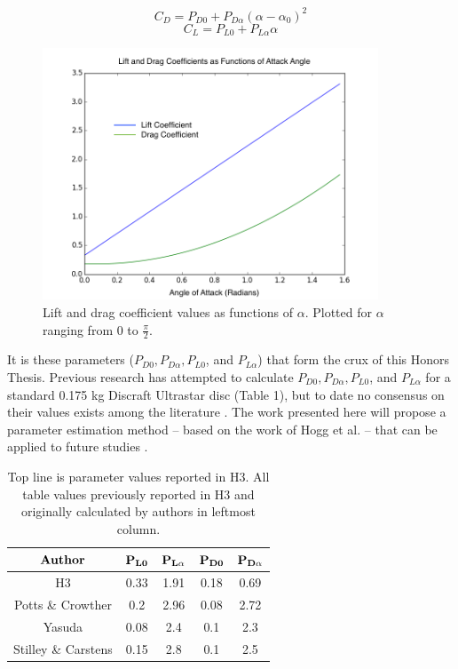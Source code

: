\documentclass[a4paper,12pt, oneside]{article}
\begin{document}
\begin{equation}
  C_D=P_{D0}+P_{D\alpha}(\alpha-\alpha_0)^2
\end{equation}
\begin{equation}
  C_L=P_{L0}+P_{L\alpha}\alpha
\end{equation}
\begin{figure}[H]
	\centering
	\includegraphics[width=10cm, height=7.5cm]{liftanddrag}
	\caption{Lift and drag coefficient values as functions of $\alpha.$ Plotted for $\alpha$ ranging from 0 to $\frac{\pi}{2}$.}
\end{figure}
It is these parameters ($P_{D0}, P_{D\alpha}, P_{L0}$, and $P_{L\alpha}$) that form the crux of this Honors Thesis. Previous research has attempted to calculate $P_{D0}, P_{D\alpha}, P_{L0}$, and $P_{L\alpha}$ for a standard 0.175 kg Discraft Ultrastar disc (Table 1), but to date no consensus on their values exists among the literature \cite{H3, pottsandcrowther2007, yasuda, stilleyandcarstens}. The work presented here will propose a parameter estimation method -- based on the work of Hogg et al. -- that can be applied to future studies \cite{hogg2010data}.

\begin{table}[h]\label{tab:1}
\centering
\begin{tabular}{| c | c | c | c | c |}
\hline
$\bf{Author}$ & $\bf{P_{L0}}$ & $\bf{P_{L\alpha}}$ & $\bf{P_{D0}}$ & $\bf{P_{D\alpha}}$ \\ \hline
H3 & 0.33 & 1.91 & 0.18 & 0.69  \\ \hline
Potts \& Crowther & 0.2 & 2.96 & 0.08 & 2.72 \\ \hline
Yasuda & 0.08 & 2.4 & 0.1 & 2.3 \\ \hline
Stilley \& Carstens & 0.15 & 2.8 & 0.1 & 2.5 \\ \hline
\end{tabular}
\caption{Top line is parameter values reported in H3. All table values previously reported in H3 and originally calculated by authors in leftmost column.}
\end{table} 
\end{document}
